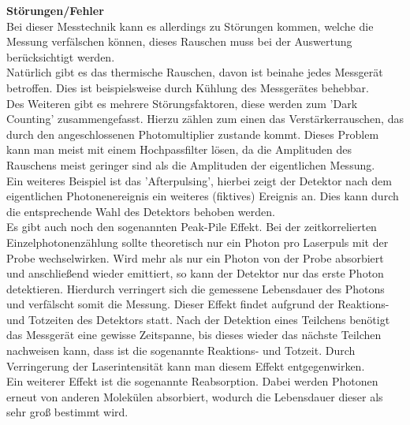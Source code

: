 \textbf{Störungen/Fehler}\\
Bei dieser Messtechnik kann es allerdings zu Störungen kommen, 
welche die Messung verfälschen können, dieses Rauschen muss
bei der Auswertung berücksichtigt werden.\\
Natürlich gibt es das thermische Rauschen, davon ist beinahe jedes
Messgerät betroffen. Dies ist beispielsweise durch Kühlung
des Messgerätes behebbar.\\
Des Weiteren gibt es mehrere Störungsfaktoren, diese werden zum 'Dark Counting' 
zusammengefasst.
Hierzu zählen zum einen das Verstärkerrauschen, das durch den angeschlossenen Photomultiplier
zustande kommt. Dieses Problem kann man meist mit einem Hochpassfilter lösen, da die Amplituden 
des Rauschens meist geringer sind als die Amplituden der eigentlichen Messung. \\
Ein weiteres Beispiel ist das 'Afterpulsing', hierbei zeigt der Detektor nach dem 
eigentlichen Photonenereignis ein weiteres (fiktives) Ereignis an.
Dies kann durch die entsprechende Wahl des Detektors behoben werden. \citep[vgl.][]{TCSPC}\\
Es gibt auch noch den sogenannten Peak-Pile Effekt. 
Bei der zeitkorrelierten Einzelphotonenzählung sollte theoretisch nur ein Photon pro Laserpuls
mit der Probe wechselwirken. 
Wird mehr als nur ein Photon von der Probe absorbiert und anschließend
wieder emittiert, so kann der Detektor nur das erste Photon detektieren. 
Hierdurch verringert sich die gemessene Lebensdauer des Photons und verfälscht somit die Messung. 
Dieser Effekt findet aufgrund der Reaktions- und Totzeiten des Detektors statt. Nach der 
Detektion eines Teilchens benötigt das Messgerät eine gewisse Zeitspanne, 
bis dieses wieder das nächste Teilchen nachweisen kann, dass ist die sogenannte Reaktions- und Totzeit. 
Durch Verringerung der Laserintensität kann man diesem Effekt entgegenwirken.\\
Ein weiterer Effekt ist die sogenannte Reabsorption. 
Dabei werden Photonen erneut von anderen 
Molekülen absorbiert, wodurch die Lebensdauer dieser als sehr groß bestimmt 
wird. \citep[vgl.][]{UniBerlin}
\newpage
